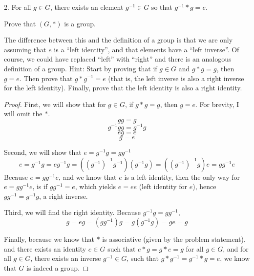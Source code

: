 \documentclass[a4paper]{article}
\begin{document}
\begin{myparindent}{0pt}
2. For all $g \in G$, there exists an element $g^{-1} \in G$ so that
$g^{-1} * g = e$.

Prove that $(G, *)$ is a group. \newline

The difference between this and the definition of a group is that we are only
assuming that $e$ is a “left identity”, and that elements have a “left inverse”.
Of course, we could have replaced “left” with “right” and there is an analogous
definition of a group. Hint: Start by proving that if $g \in G$ and
$g * g = g$, then $g = e$. Then prove that $g * g^{-1} = e$ (that is, the left
inverse is also a right inverse for the left identity). Finally, prove that the
left identity is also a right identity. \newline

\begin{proof}
  First, we will show that for $g \in G$, if $g * g = g$, then $g = e$. For
  brevity, I will omit the $*$.
  \[ gg = g \]
  \[ g^{-1}gg = g^{-1} g \]
  \[ eg = e \]
  \[ g = e \]

  Second, we will show that $e = g^{-1}g = gg^{-1}$
  \[ e = g^{-1}g = eg^{-1}g = (({g^{-1}})^{-1}g^{-1}) (g^{-1}g) = (({g^{-1}})^{-1}g) e = gg^{-1}e \]
  Because $e = gg^{-1}e$, and we know that $e$ is a left identity, then the only
  way for $e = gg^{-1}e$, is if $gg^{-1} = e$, which yields $e = ee$ (left identity for $e$), hence $gg^{-1} = g^{-1}g$,
  a right inverse. \newline

  Third, we will find the right identity. Because $g^{-1}g = gg^{-1}$,
  \[ g = eg = (gg^{-1})g = g(g^{-1}g) = ge = g \]

  Finally, because we know that $*$ is associative (given by the problem
  statement), and there exists an identity $e \in G$ such that
  $e * g = g * e = g$ for all $g \in G$, and for all $g \in G$, there exists
  an inverse $g^{-1} \in G$, such that $g * g^{-1} = g^{-1} * g = e$, we know
  that $G$ is indeed a group.
\end{proof}

\end{myparindent}
\end{document}
